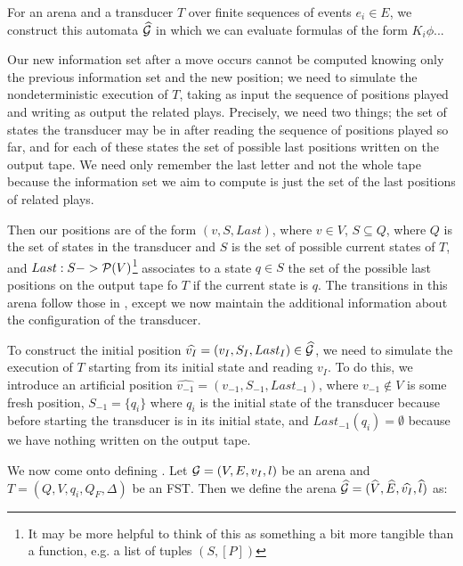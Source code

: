 \documentclass[12pt, a4paper]{article}
\begin{document}
For an arena  and a transducer $T$ over finite sequences of events $e_i \in
E$, we construct this automata $\widehat{\mathcal{G}}$ in which we can evaluate
formulas of the form $K_i \phi$... 

Our new information set after a move occurs cannot be computed knowing only the
previous information set and the new position; we need to simulate the
nondeterministic execution of $T$, taking as input the sequence of positions
played and writing as output the related plays. Precisely, we need two things;
the set of states the transducer may be in after reading the sequence of
positions played so far, and for each of these states the set of possible last
positions written on the output tape. We need only remember the last letter and
not the whole tape because the information set we aim to compute is just the set
of the last positions of related plays.

Then our positions are of the form $(v, S, Last)$, where $v \in V$, $S \subseteq
Q$, where $Q$ is the set of states in the transducer and $S$ is the set of
possible current states of $T$, and $Last : S -> \mathcal{P}(V)$\footnote{It may be
  more helpful to think of this as something a bit more tangible than a
  function, e.g. a list of tuples $(S, [P])$} associates to a state $q \in S$
the set of the possible last positions on the output tape fo $T$ if the current
state is $q$. The transitions in this arena follow those in , except we
now maintain the additional information about the configuration of the
transducer.

To construct the initial position $\widehat{v_I} = (v_I, S_I, Last_I) \in
\widehat{\mathcal{G}}$, we need to simulate the execution of $T$ starting from its
initial state and reading $v_I$. To do this, we introduce an artificial position
$\widehat{v_{-1}} = (v_{-1}, S_{-1}, Last_{-1})$, where $v_{-1} \not \in V$ is
some fresh position, $S_{-1} = \{q_i\}$ where $q_i$ is the initial state of the
transducer because before starting the transducer is in its initial state, and
$Last_{-1} (q_i) = \emptyset$ because we have nothing written on the output
tape.  

\bigskip

We now come onto defining . Let $\mathcal{G} = (V, E, v_I, l)$ be an arena and
$T = (Q, V, q_i, Q_F, \Delta)$ be an FST. Then we define the arena
$\widehat{\mathcal{G}} = (\widehat{V}, \widehat{E}, \widehat{v_I}, \widehat{l})$ as:
\end{document}
